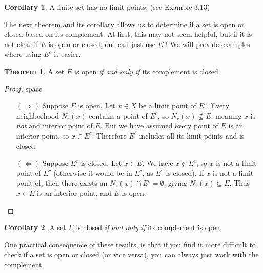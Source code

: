 \documentclass{article}
\theoremstyle{definition}
\newtheorem{theorem}{Theorem}[section]
\newtheorem{corollary}{Corollary}[section]
\begin{document}
\begin{corollary}
A finite set has no limit points. (see Example 3.13)
\end{corollary}
The next theorem and its corollary allows us to determine if a set is open or closed based on its complement. At first, this may not seem helpful, but if it is not clear if $ E $ is open or closed, one can just use $ E^c $! We will provide examples where using $ E^c $ is easier.
\begin{theorem}
	A set $ E $ is open \textit{if and only if} its complement is closed.
\end{theorem}
\begin{proof}{\color{white}space}
	\begin{enumerate}
		\item [$ (\Longrightarrow) $] Suppose $ E $ is open. Let $ x\in X $ be a limit point of $ E^c $. Every neighborhood $ N_r(x) $ contains a point of $ E^c $, so $ N_r(x)\not\subseteq E $, meaning $ x $ is \textit{not} and interior point of $ E $. But we have assumed every point of $ E $ is an interior point, so $ x\in E^c $. Therefore $ E^c $ includes all its limit points and is closed.   
		\item [$ (\Longleftarrow) $] Suppose $ E^c $ is closed. Let $ x\in E $. We have $ x\notin E^c $, so $ x $ is not a limit point of $ E^c $ (otherwise it would be in $ E^c $, as $ E^c $ is closed). If $ x $ is not a limit point of, then there exists an $ N_r(x)\cap E^c=\emptyset $, giving $ N_r(x)\subseteq E $. Thus $ x\in E $ is an interior point, and $ E $ is open.  
	\end{enumerate}
\end{proof}
\begin{corollary}
	A set $ E $ is closed \textit{if and only if} its complement is open.
\end{corollary}
One practical consequence of these results, is that if you find it more difficult to check if a set is open or closed (or vice versa), you can always just work with the complement. 
\end{document}
